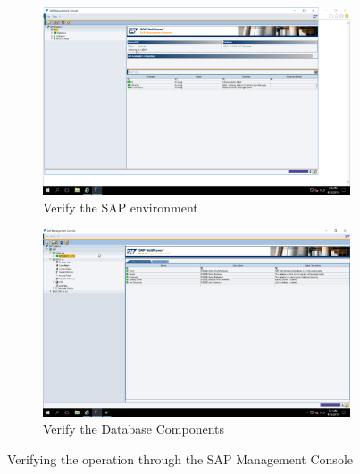 \begin{figure}[h]
    \begin{subfigure}{0.5\textwidth}
        \captionsetup{width=0.8\linewidth}
        \includegraphics[width=0.9\linewidth]{img/Methodologie/SAP0.png}
        \centering
        \caption{Verify the SAP environment}
    \end{subfigure}
    \begin{subfigure}{0.5\textwidth}
        \captionsetup{width=0.8\linewidth}
        \includegraphics[width=0.9\linewidth]{img/Methodologie/SAP1.png} 
        \centering
        \caption{Verify the Database Components}
    \end{subfigure}
    \caption[Prerequisites of the in-place upgrade]{Verifying the operation through the SAP Management Console}
    \label{fig:SAPPreInPlace}	
\end{figure}
\clearpage

